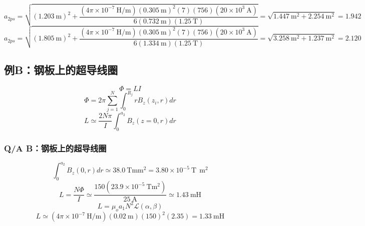 \begin{equation}%
a_{2ps}=\sqrt{(1.203\ \mathrm{m})^2+\frac{(4\pi\times10^{-7}\ \mathrm{H/m})(0.305\ \mathrm{m})^2(7)(756)(20\times10^3\ \mathrm{A})}{6(0.732\ \mathrm{m})(1.25\ \mathrm{T})}}=\sqrt{1.447\ \mathrm{m^2}+2.254\ \mathrm{m^2}}=1.942
\end{equation}
\begin{equation}%
a_{2ps}=\sqrt{(1.805\ \mathrm{m})^2+\frac{(4\pi\times10^{-7}\ \mathrm{H/m})(0.305\ \mathrm{m})^2(7)(756)(20\times10^3\ \mathrm{A})}{6(1.334\ \mathrm{m})(1.25\ \mathrm{T})}}=\sqrt{3.258\ \mathrm{m^2}+1.237\ \mathrm{m^2}}=2.120
\end{equation}




\subsection{例B：钢板上的超导线圈}

\begin{equation}%
\Phi=LI
\end{equation}
\begin{equation}%
\Phi=2\pi\sum_{j=1}^{N}\int_{0}^{R_j}rB_z(z_i,r)dr
\end{equation}
\begin{equation}%
L\simeq\frac{2N\pi}{I}\int_{0}^{a_2}B_z(z=0,r)dr
\end{equation}



\subsubsection{Q/A B：钢板上的超导线圈}


\begin{equation}%
\int_{0}^{a_2}B_z(0,r)dr\simeq38.0\ \mathrm{T mm^2}=3.80\times10^{-5}\ \mathrm{T\ \ m^2}
\end{equation}
\begin{equation}%
L=\frac{N\Phi}{I}\simeq\frac{150(23.9\times10^{-5}\ \mathrm{Tm^2})}{25\ \mathrm{A}}\simeq1.43\ \mathrm{mH}
\end{equation}
\begin{equation}%
L=\mu_oa_1N^2\mathcal{L}(\alpha,\beta)
\end{equation}
\begin{equation}%
L\simeq(4\pi\times10^{-7}\ \mathrm{H/m})(0.02\ \mathrm{m})(150)^2(2.35)=1.33\ \mathrm{mH}
\end{equation}




